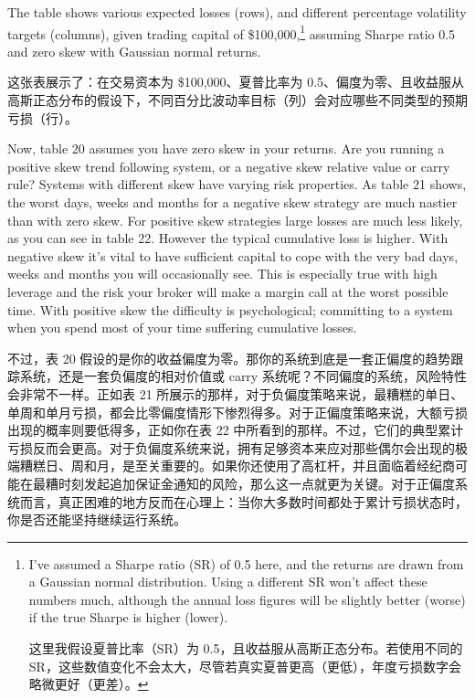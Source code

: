 \begin{englishblock} The table shows various expected losses (rows), and different percentage volatility targets (columns), given trading capital of \$100,000,\footnote{I've assumed a Sharpe ratio (SR) of 0.5 here, and the returns are drawn from a Gaussian normal distribution. Using a different SR won't affect these numbers much, although the annual loss figures will be slightly better (worse) if the true Sharpe is higher (lower). \par 这里我假设夏普比率（SR）为 0.5，且收益服从高斯正态分布。若使用不同的 SR，这些数值变化不会太大，尽管若真实夏普更高（更低），年度亏损数字会略微更好（更差）。} assuming Sharpe ratio 0.5 and zero skew with Gaussian normal returns. \end{englishblock}

\begin{chineseblock}这张表展示了：在交易资本为 \$100,000、夏普比率为 0.5、偏度为零、且收益服从高斯正态分布的假设下，不同百分比波动率目标（列）会对应哪些不同类型的预期亏损（行）。\end{chineseblock}

\bipairgap

\begin{englishblock} Now, table 20 assumes you have zero skew in your returns. Are you running a positive skew trend following system, or a negative skew relative value or carry rule? Systems with different skew have varying risk properties. As table 21 shows, the worst days, weeks and months for a negative skew strategy are much nastier than with zero skew. For positive skew strategies large losses are much less likely, as you can see in table 22. However the typical cumulative loss is higher. With negative skew it's vital to have sufficient capital to cope with the very bad days, weeks and months you will occasionally see. This is especially true with high leverage and the risk your broker will make a margin call at the worst possible time. With positive skew the difficulty is psychological; committing to a system when you spend most of your time suffering cumulative losses. \end{englishblock}

\begin{chineseblock}不过，表 20 假设的是你的收益偏度为零。那你的系统到底是一套正偏度的趋势跟踪系统，还是一套负偏度的相对价值或 carry 系统呢？不同偏度的系统，风险特性会非常不一样。正如表 21 所展示的那样，对于负偏度策略来说，最糟糕的单日、单周和单月亏损，都会比零偏度情形下惨烈得多。对于正偏度策略来说，大额亏损出现的概率则要低得多，正如你在表 22 中所看到的那样。不过，它们的典型累计亏损反而会更高。对于负偏度系统来说，拥有足够资本来应对那些偶尔会出现的极端糟糕日、周和月，是至关重要的。如果你还使用了高杠杆，并且面临着经纪商可能在最糟时刻发起追加保证金通知的风险，那么这一点就更为关键。对于正偏度系统而言，真正困难的地方反而在心理上：当你大多数时间都处于累计亏损状态时，你是否还能坚持继续运行系统。\end{chineseblock}

